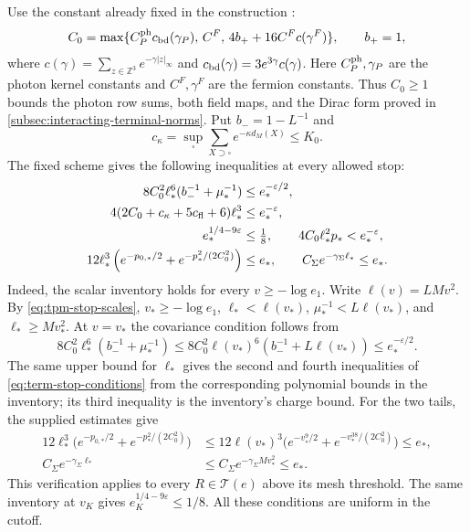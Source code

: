 \documentclass[11pt,letterpaper,reqno]{amsart}
\newcommand{\Z}{\mathbb Z}
\begin{document}
Use the constant already fixed in the construction
\cite[(25)]{QED3Integration}:
\[
 C_0=\max\{C_P^{\rm ph}c_{\rm bd}(\gamma_P),\,
               C^F,\,4b_++16C^Fc(\gamma^F)\},\qquad b_+=1,
\]
where $c(\gamma)=\sum_{z\in\Z^3}e^{-\gamma|z|_\infty}$ and
$c_{\rm bd}(\gamma)=3e^{3\gamma}c(\gamma)$.
Here $C_P^{\rm ph},\gamma_P$ are the photon kernel constants
and $C^F,\gamma^F$ are the fermion constants. Thus $C_0\ge1$
bounds the photon row sums, both field maps, and the Dirac form
proved in \cref{subsec:interacting-terminal-norms}.
Put $b_-=1-L^{-1}$ and
\[
 c_\kappa=\sup_\square\sum_{X\supset\square}
                                      e^{-\kappa d_M(X)}\le K_0.
\]
The fixed scheme gives the following inequalities at every
allowed stop:
\begin{align}
 8C_0^2\ell_*^6(b_-^{-1}+\mu_*^{-1})
                   &\le e_*^{-\varepsilon/2},\nonumber\\
 4(2C_0+c_\kappa+5c_{\rm fl}+6)\ell_*^3
                   &\le e_*^{-\varepsilon},\nonumber\\
 e_*^{1/4-9\varepsilon}&\le\tfrac18,\qquad
 4C_0\ell_*^2p_*<e_*^{-\varepsilon},\nonumber\\
 12\ell_*^3\left(e^{-p_{0,*}/2}
                         +e^{-p_*^2/(2C_0^2)}\right)&\le e_*,
 \qquad
 C_\Sigma e^{-\gamma_\Sigma\ell_*}\le e_*.
                                      \label{eq:term-stop-conditions}
\end{align}
Indeed, the scalar inventory \cite[(29)]{QED3Integration}
holds for every $v\ge-\log e_1$. Write $\ell(v)=LMv^2$.
By \eqref{eq:tpm-stop-scales}, $v_*\ge-\log e_1$,
$\ell_*<\ell(v_*)$, $\mu_*^{-1}<L\ell(v_*)$, and
$\ell_*\ge Mv_*^2$. At $v=v_*$ the covariance condition follows from
\[
 8C_0^2\ell_*^6(b_-^{-1}+\mu_*^{-1})
 \le8C_0^2\ell(v_*)^6(b_-^{-1}+L\ell(v_*))
 \le e_*^{-\varepsilon/2}.
\]
The same upper bound for $\ell_*$ gives the second and fourth
inequalities of \eqref{eq:term-stop-conditions} from the
corresponding polynomial bounds in the inventory; its third
inequality is the inventory's charge bound. For the two tails,
the supplied estimates give
\begin{align*}
12\ell_*^3\big(e^{-p_{0,*}/2}+e^{-p_*^2/(2C_0^2)}\big)
 &\le12\ell(v_*)^3
       \big(e^{-v_*^9/2}+e^{-v_*^{38}/(2C_0^2)}\big)\le e_*,
\\
C_\Sigma e^{-\gamma_\Sigma\ell_*}
 &\le C_\Sigma e^{-\gamma_\Sigma Mv_*^2}\le e_*.
\end{align*}
This verification applies to every $R\in\mathcal T(e)$ above
its mesh threshold. The same inventory at $v_K$ gives
$e_K^{1/4-9\varepsilon}\le1/8$. All these conditions are
uniform in the cutoff.
\end{document}
